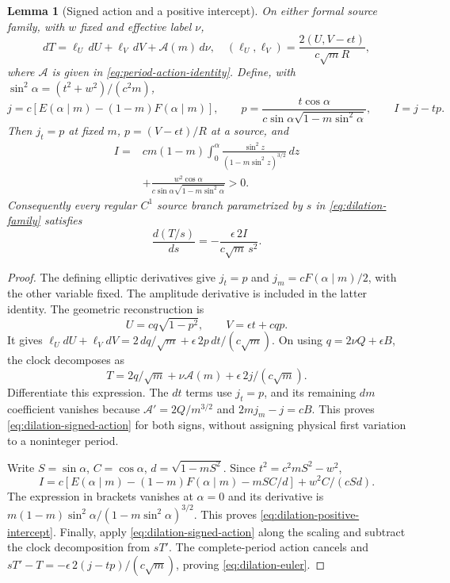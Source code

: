 \documentclass[11pt,a4paper]{article}
\newtheorem{lemma}[theorem]{Lemma}
\theoremstyle{remark}\newtheorem{remark}[theorem]{Remark}
\begin{document}
\begin{lemma}[Signed action and a positive intercept]
\label{lem:dilation-action}
On either formal source family, with $w$ fixed and effective label $\nu$,
\begin{equation}\label{eq:dilation-signed-action}
 dT=\ell_U\,dU+\ell_V\,dV+\mathcal A(m)\,d\nu,
 \quad (\ell_U,\ell_V)=\frac{2(U,V-\epsilon t)}{c\sqrt m R},
\end{equation}
where $\mathcal A$ is given in \eqref{eq:period-action-identity}.
Define, with $\sin^2\alpha=(t^2+w^2)/(c^2m)$,
\[
 j=c[E(\alpha\mid m)-(1-m)F(\alpha\mid m)],\qquad
 p=\frac{t\cos\alpha}{c\sin\alpha\sqrt{1-m\sin^2\alpha}},
 \qquad I=j-tp.
\]
Then $j_t=p$ at fixed $m$, $p=(V-\epsilon t)/R$ at a source, and
\begin{equation}\label{eq:dilation-positive-intercept}
 \begin{split}
 I={}&cm(1-m)\int_0^\alpha
       \frac{\sin^2z}{(1-m\sin^2z)^{3/2}}\,dz\\
 &+\frac{w^2\cos\alpha}
 {c\sin\alpha\sqrt{1-m\sin^2\alpha}}>0.
 \end{split}
\end{equation}
Consequently every regular $C^1$ source branch parametrized by $s$ in
\eqref{eq:dilation-family} satisfies
\begin{equation}\label{eq:dilation-euler}
 \frac{d(T/s)}{ds}=-\frac{\epsilon\,2I}{c\sqrt m\,s^2}.
\end{equation}
\end{lemma}
\begin{proof}
The defining elliptic derivatives \cite[Sections 19.2 and 19.4]{DLMF}
give $j_t=p$ and $j_m=cF(\alpha\mid m)/2$, with the other variable
fixed. The amplitude derivative is included in the latter identity.
The geometric reconstruction is
\[
 U=cq\sqrt{1-p^2},\qquad V=\epsilon t+cqp.
\]
It gives
$\ell_U dU+\ell_V dV=2\,dq/\sqrt m+\epsilon\,2p\,dt/(c\sqrt m)$.
On using $q=2\nu Q+\epsilon B$, the clock decomposes as
\[
 T=2q/\sqrt m+\nu\mathcal A(m)+\epsilon\,2j/(c\sqrt m).
\]
Differentiate this expression. The $dt$ terms use $j_t=p$, and its
remaining $dm$ coefficient vanishes because
$\mathcal A'=2Q/m^{3/2}$ and $2mj_m-j=cB$. This proves
\eqref{eq:dilation-signed-action} for both signs, without assigning
physical first variation to a noninteger period.

Write $S=\sin\alpha$, $C=\cos\alpha$, $d=\sqrt{1-mS^2}$.
Since $t^2=c^2mS^2-w^2$,
\[
 I=c[E(\alpha\mid m)-(1-m)F(\alpha\mid m)-mSC/d]
   +w^2C/(cSd).
\]
The expression in brackets vanishes at $\alpha=0$ and its derivative
is $m(1-m)\sin^2\alpha/(1-m\sin^2\alpha)^{3/2}$.
This proves \eqref{eq:dilation-positive-intercept}. Finally, apply
\eqref{eq:dilation-signed-action} along the scaling and subtract the
clock decomposition from $sT'$. The complete-period action cancels and
$sT'-T=-\epsilon\,2(j-tp)/(c\sqrt m)$, proving
\eqref{eq:dilation-euler}.
\end{proof}
\end{document}
